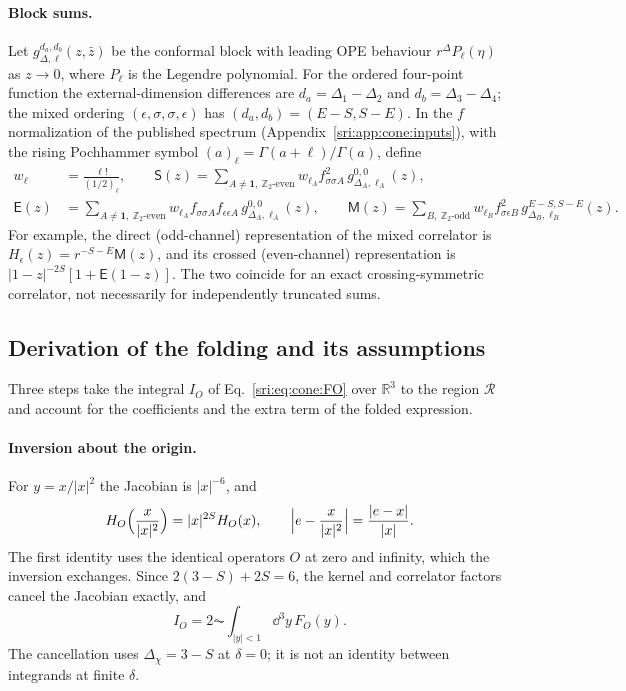 \paragraph{Block sums.} Let $g_{\Delta,\ell}^{d_a,d_b}(z,\bar z)$ be the conformal block with leading OPE behaviour
$r^\Delta P_\ell(\eta)$ as $z\to0$, where $P_\ell$ is the Legendre polynomial. For the ordered four-point function the
external-dimension differences are $d_a=\Delta_1-\Delta_2$ and $d_b=\Delta_3-\Delta_4$; the mixed ordering
$(\epsilon,\sigma,\sigma,\epsilon)$ has $(d_a,d_b)=(E-S,S-E)$. In the $f$ normalization of the published spectrum
(Appendix~\ref{sri:app:cone:inputs}), with the rising Pochhammer symbol $(a)_\ell=\Gamma(a+\ell)/\Gamma(a)$, define
\begin{equation}
\begin{aligned}
 w_\ell&=\frac{\ell!}{(1/2)_\ell},\qquad
 \mathsf S(z)=\sum_{A\ne\mathbf 1,\ \mathbb Z_2\text{-even}}w_{\ell_A}f_{\sigma\sigma A}^2\,g_{\Delta_A,\ell_A}^{0,0}(z),\\
 \mathsf E(z)&=\sum_{A\ne\mathbf 1,\ \mathbb Z_2\text{-even}}w_{\ell_A}f_{\sigma\sigma A}f_{\epsilon\epsilon A}\,
 g_{\Delta_A,\ell_A}^{0,0}(z),\qquad
 \mathsf M(z)=\sum_{B,\ \mathbb Z_2\text{-odd}}w_{\ell_B}f_{\sigma\epsilon B}^2\,g_{\Delta_B,\ell_B}^{E-S,S-E}(z).
\end{aligned}
 \label{sri:eq:cone:sums}
\end{equation}
For example, the direct (odd-channel) representation of the mixed correlator is $H_\epsilon(z)=r^{-S-E}\mathsf M(z)$,
and its crossed (even-channel) representation is $|1-z|^{-2S}[1+\mathsf E(1-z)]$. The two coincide for an exact
crossing-symmetric correlator, not necessarily for independently truncated sums.

\subsection{Derivation of the folding and its assumptions}\label{sri:app:cone:folding}
Three steps take the integral $I_O$ of Eq.~\eqref{sri:eq:cone:FO} over $\mathbb R^3$ to the region $\mathcal R$ and account
for the coefficients and the extra term of the folded expression.

\paragraph{Inversion about the origin.} For $y=x/|x|^2$ the Jacobian is $|x|^{-6}$, and
\begin{equation}
 H_O\Bigl(\frac{x}{|x|^2}\Bigr)=|x|^{2S}H_O(x),\qquad \Bigl|e-\frac{x}{|x|^2}\Bigr|=\frac{|e-x|}{|x|}.
\end{equation}
The first identity uses the identical operators $O$ at zero and infinity, which the inversion exchanges. Since
$2(3-S)+2S=6$, the kernel and correlator factors cancel the Jacobian exactly, and
\begin{equation}
 I_O=2\AC\!\int_{|y|<1}\dd^3y\,F_O(y).
 \label{sri:eq:cone:foldorigin}
\end{equation}
The cancellation uses $\Delta_\chi=3-S$ at $\delta=0$; it is not an identity between integrands at finite $\delta$.

